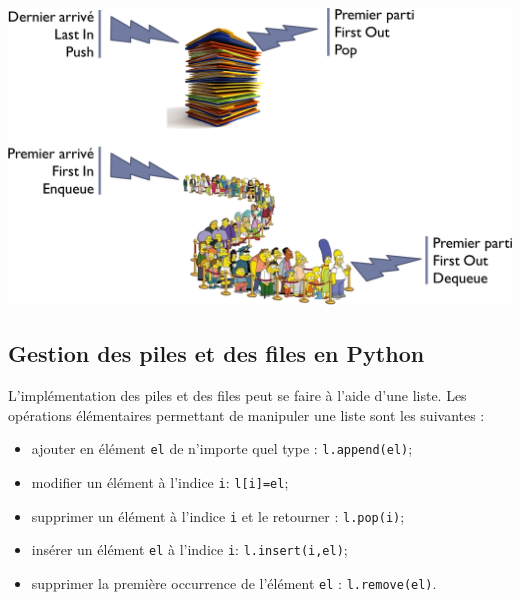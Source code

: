 \documentclass[10pt,fleqn]{article} %
\begin{document}
\begin{minipage}[c]{.45\linewidth}
\includegraphics[width=\linewidth]{images/fifo_lifo}
\end{minipage}
\subsection{Gestion des piles et des files en Python}
L’implémentation des piles et des files peut se faire à l'aide d'une liste. Les opérations élémentaires permettant de manipuler une liste sont les suivantes :
\begin{itemize}[label=,font=\color{ocre}] 
\item ajouter en élément \texttt{el} de n'importe quel type : \texttt{l.append(el)};
\item modifier un élément à l'indice \texttt{i}: \texttt{l[i]=el};
\item supprimer un élément à l'indice \texttt{i} et le retourner : \texttt{l.pop(i)};
\item insérer un élément \texttt{el} à l'indice \texttt{i}: \texttt{l.insert(i,el)};
\item supprimer la première occurrence de l'élément \texttt{el} : \texttt{l.remove(el)}.
\end{itemize}
\end{document}
